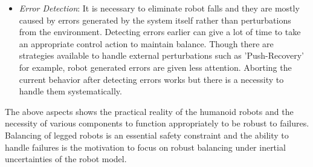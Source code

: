 \begin{itemize}
    \item \textit{Error Detection}: It is necessary to eliminate robot falls and they are mostly caused by errors generated by the system itself rather than perturbations from the environment. Detecting errors earlier can give a lot of time to take an appropriate control action to maintain balance. Though there are strategies available to handle external perturbations such as 'Push-Recovery' for example, robot generated errors are given less attention. Aborting the current behavior after detecting errors works but there is a necessity to handle them systematically. 

\end{itemize}

The above aspects shows the practical reality of the humanoid robots and the necessity of various components to function appropriately to be robust to failures. Balancing of legged robots is an essential safety constraint and the ability to handle failures is the motivation to focus on robust  balancing under inertial uncertainties of the robot model.  
